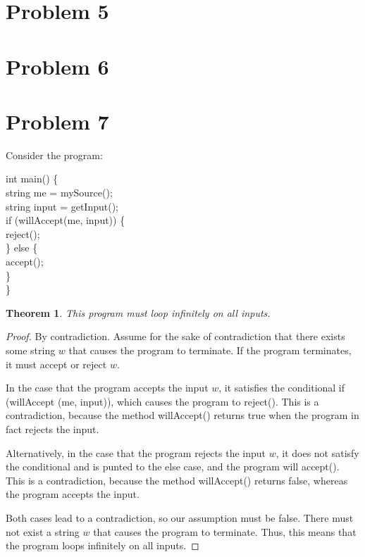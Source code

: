 \documentclass[10pt,letter]{article}
\newtheorem*{thm}{Theorem}
\begin{document}
\section*{Problem 5}
\section*{Problem 6}
\section*{Problem 7}

Consider the program:
{\selectfont

\hspace*{10 mm} int main() \{\\
\hspace*{20 mm} string me = mySource();\\
\hspace*{20 mm} string input = getInput();\\
\hspace*{20 mm} if (willAccept(me, input)) \{\\
\hspace*{30 mm} reject();\\
\hspace*{20 mm} \} else \{\\
\hspace*{30 mm} accept();\\
\hspace*{20 mm} \}\\
\hspace*{10 mm} \}
}
\begin{thm}This program must loop infinitely on all inputs.\end{thm}
\begin{proof}
By contradiction. Assume for the sake of contradiction that there exists some string $w$ that causes the program to terminate. If the program terminates, it must accept or reject $w$. 

In the case that the program accepts the input $w$, it satisfies the conditional {\selectfont if (willAccept (me, input))}, which causes the program to {\selectfont reject()}. This is a contradiction, because the method {\selectfont willAccept()} returns true when the program in fact rejects the input.

Alternatively, in the case that the program rejects the input $w$, it does not satisfy the conditional and is punted to the {\selectfont else} case, and the program will {\selectfont accept()}. This is a contradiction, because the method {\selectfont willAccept()} returns false, whereas the program accepts the input.

Both cases lead to a contradiction, so our assumption must be false. There must not exist a string $w$ that causes the program to terminate. Thus, this means that the program loops infinitely on all inputs. 
\end{proof}
\end{document}
